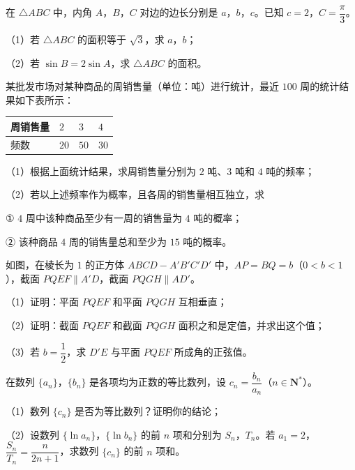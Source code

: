 \begin{question}
在 $\triangle ABC$ 中，内角 $A$，$B$，$C$ 对边的边长分别是 $a$，$b$，$c$。已知 $c=2$，$C=\dfrac{\pi}{3}$。

（1）若 $\triangle ABC$ 的面积等于 $\sqrt3$，求 $a$，$b$；

（2）若 $\sin B=2\sin A$，求 $\triangle ABC$ 的面积。

\end{question}
\begin{question}
某批发市场对某种商品的周销售量（单位：吨）进行统计，最近 $100$ 周的统计结果如下表所示：

\begin{center}
\begin{tabular}{llll}
\toprule
周销售量 & $2$ & $3$ & $4$ \\
\midrule
频数 & $20$ & $50$ & $30$ \\
\bottomrule
\end{tabular}
\end{center}

（1）根据上面统计结果，求周销售量分别为 $2$ 吨、$3$ 吨和 $4$ 吨的频率；

（2）若以上述频率作为概率，且各周的销售量相互独立，求

① $4$ 周中该种商品至少有一周的销售量为 $4$ 吨的概率；

② 该种商品 $4$ 周的销售量总和至少为 $15$ 吨的概率。

\Needspace{0.4\textheight}
\end{question}
\begin{question}
如图，在棱长为 $1$ 的正方体 $ABCD-A'B'C'D'$ 中，$AP=BQ=b$（$0<b<1$），截面 $PQEF\parallel A'D$，截面 $PQGH\parallel AD'$。

（1）证明：平面 $PQEF$ 和平面 $PQGH$ 互相垂直；

（2）证明：截面 $PQEF$ 和截面 $PQGH$ 面积之和是定值，并求出这个值；

（3）若 $b=\dfrac12$，求 $D'E$ 与平面 $PQEF$ 所成角的正弦值。
\nopagebreak[4]
\begin{center}\end{center}
\nopagebreak[4]
\end{question}
\begin{question}
在数列 $\{a_n\}$，$\{b_n\}$ 是各项均为正数的等比数列，设 $c_n=\dfrac{b_n}{a_n}$（$n\in\mathbf N^*$）。

（1）数列 $\{c_n\}$ 是否为等比数列？证明你的结论；

（2）设数列 $\{\ln a_n\}$，$\{\ln b_n\}$ 的前 $n$ 项和分别为 $S_n$，$T_n$。若 $a_1=2$，$\dfrac{S_n}{T_n}=\dfrac{n}{2n+1}$，求数列 $\{c_n\}$ 的前 $n$ 项和。

\end{question}
